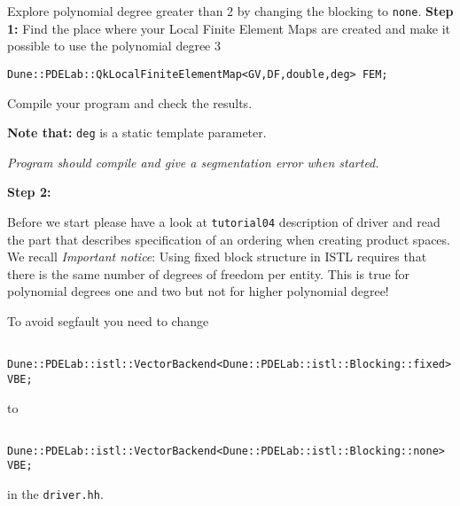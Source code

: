 \documentclass[12pt,a4paper]{article}
\begin{document}
\begin{Exercise}{ Explore polynomial degree greater than $2$ by changing the blocking
to \lstinline{none}. }
 \textbf{Step 1:}
Find the place where your Local Finite Element Maps are created and make it possible to use the polynomial degree 3

\begin{lstlisting}
Dune::PDELab::QkLocalFiniteElementMap<GV,DF,double,deg> FEM;
\end{lstlisting} 

Compile your program and check the results.

\textbf{Note that:} \lstinline!deg! is a static template parameter.

\textit{Program should compile and give a segmentation error when started.}


 \textbf{Step 2:}

Before we start please have a look at \lstinline!tutorial04! description of driver  and read the part that describes specification of an ordering when creating
product spaces. We recall \textit{Important notice}: Using fixed block structure in ISTL requires that there is the same number of degrees of freedom per entity. This is true for polynomial degrees one and two but not for higher polynomial degree!
 
 To avoid segfault you need to change 
 
  \begin{lstlisting}
  Dune::PDELab::istl::VectorBackend<Dune::PDELab::istl::Blocking::fixed> VBE;  \end{lstlisting} 
 to 
\begin{lstlisting}
  Dune::PDELab::istl::VectorBackend<Dune::PDELab::istl::Blocking::none> VBE;  \end{lstlisting} 
 in the  \lstinline!driver.hh!.
 
\end{Exercise}
\end{document}
